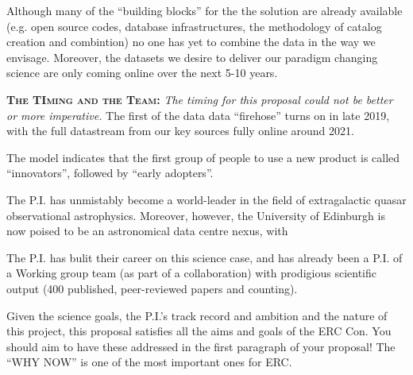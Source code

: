 \documentclass[oneside, a4paper, onecolumn, 11pt]{article}
\begin{document}
\smallskip
\smallskip
\noindent
Although many of the ``building blocks'' for the the solution are already available
(e.g. open source codes, database infrastructures, the methodology of catalog creation and combintion) 
no one has yet to combine the data in the way we envisage. Moreover, the datasets we desire
to deliver our paradigm changing science are only coming online over the next 5-10 years.


\smallskip
\smallskip
\noindent
\textbf{\textsc{The TIming and the Team:}}
{\it The timing for this proposal could not be better or more imperative.} 
The first of the data data ``firehose'' turns on in late 2019, with
the full datastream from our key sources fully online around 2021. 

\smallskip
\smallskip
\noindent
The model indicates that the first group of people to use a new
product is called ``innovators'', followed by ``early adopters''. 

\smallskip
\smallskip
\noindent
The P.I. has unmistably become a world-leader in the field of 
extragalactic quasar observational astrophysics. 
Moreover, however, the University of Edinburgh is now poised to be an 
astronomical data centre nexus, with 

\smallskip
\smallskip
\noindent
The P.I. has bulit their career on this science case, and has already been a P.I. 
of a Working group team (as part of a collaboration) with prodigious scientific
output (400 published, peer-reviewed papers and counting). 


Given the science goals, the P.I.'s track record and ambition and 
the nature of this project, this proposal satisfies all the aims and goals
of the ERC Con. 
You should aim to have these addressed in the first paragraph of your proposal! 
The “WHY NOW” is one of the most important ones for ERC.

\end{document}
